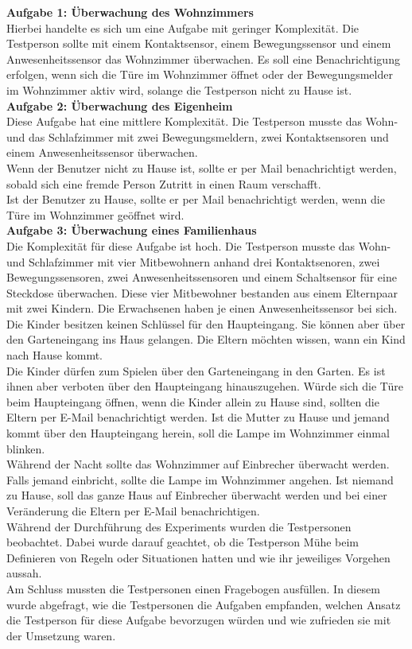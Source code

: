 %
\textbf{Aufgabe 1: Überwachung des Wohnzimmers}\\
Hierbei handelte es sich um eine Aufgabe mit geringer Komplexität. Die Testperson sollte mit einem Kontaktsensor, einem Bewegungssensor und einem Anwesenheitssensor das Wohnzimmer überwachen. Es soll eine Benachrichtigung erfolgen, wenn sich die Türe im Wohnzimmer öffnet oder der Bewegungsmelder im Wohnzimmer aktiv wird, solange die Testperson nicht zu Hause ist.\\[2ex]
%
\textbf{Aufgabe 2: Überwachung des Eigenheim}\\
Diese Aufgabe hat eine mittlere Komplexität. Die Testperson musste das Wohn- und das Schlafzimmer mit zwei Bewegungsmeldern, zwei Kontaktsensoren und einem Anwesenheitssensor überwachen.\\
Wenn der Benutzer nicht zu Hause ist, sollte er per Mail benachrichtigt werden, sobald sich eine fremde Person Zutritt in einen Raum verschafft.\\
Ist der Benutzer zu Hause, sollte er per Mail benachrichtigt werden, wenn die Türe im Wohnzimmer geöffnet wird.\\[2ex]
%
\textbf{Aufgabe 3: Überwachung eines Familienhaus}\\
Die Komplexität für diese Aufgabe ist hoch. Die Testperson musste das Wohn- und Schlafzimmer mit vier Mitbewohnern anhand drei Kontaktsenoren, zwei Bewegungssensoren, zwei Anwesenheitssensoren und einem Schaltsensor für eine Steckdose überwachen. Diese vier Mitbewohner bestanden aus einem Elternpaar mit zwei Kindern.
Die Erwachsenen haben je einen Anwesenheitssensor bei sich. Die Kinder besitzen keinen Schlüssel für den Haupteingang. Sie können aber über den Garteneingang ins Haus gelangen. Die Eltern möchten wissen, wann ein Kind nach Hause kommt.\\
Die Kinder dürfen zum Spielen über den Garteneingang in den Garten. Es ist ihnen aber verboten über den Haupteingang hinauszugehen. Würde sich die Türe beim Haupteingang öffnen, wenn die Kinder allein zu Hause sind, sollten die Eltern per E-Mail benachrichtigt werden. Ist die Mutter zu Hause und jemand kommt über den Haupteingang herein, soll die Lampe im Wohnzimmer einmal blinken.\\
Während der Nacht sollte das Wohnzimmer auf Einbrecher überwacht werden. Falls jemand einbricht, sollte die Lampe im Wohnzimmer angehen. Ist niemand zu Hause, soll das ganze Haus auf Einbrecher überwacht werden und bei einer Veränderung die Eltern per E-Mail benachrichtigen.\\[2ex]
%
Während der Durchführung des Experiments wurden die Testpersonen beobachtet. Dabei wurde darauf geachtet, ob die Testperson Mühe beim Definieren von Regeln oder Situationen hatten und wie ihr jeweiliges Vorgehen aussah.\\
Am Schluss mussten die Testpersonen einen Fragebogen ausfüllen. In diesem wurde abgefragt, wie die Testpersonen die Aufgaben empfanden, welchen Ansatz die Testperson für diese Aufgabe bevorzugen würden und wie zufrieden sie mit der Umsetzung waren.
%

